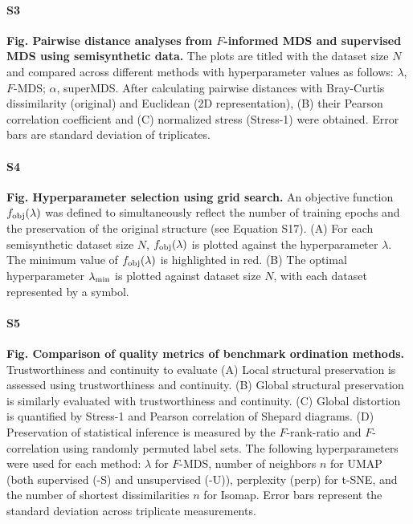 \documentclass[10pt,letterpaper]{article}
\newcommand{\1}{{\rm 1}\kern-0.24em{\rm I}}
\begin{document}
\paragraph*{S3}\hspace{-2ex}
\label{fig:sim_fmds_smds}
\textbf{Fig. Pairwise distance analyses from $F$-informed MDS and supervised MDS using semisynthetic data.} The plots are titled with the dataset size $N$ and compared across different methods with hyperparameter values as follows: $\lambda$, $F$-MDS; $\alpha$, superMDS. After calculating pairwise distances with Bray-Curtis dissimilarity (original) and Euclidean (2D representation), (B) their Pearson correlation coefficient and (C) normalized stress (Stress-1) were obtained. Error bars are standard deviation of triplicates.

\paragraph*{S4}\hspace{-2ex}
\label{fig:fmds_gridsearch}
\textbf{Fig. Hyperparameter selection using grid search.} An objective function $f_{\rm obj}(\lambda)$ was defined to simultaneously reflect the number of training epochs and the preservation of the original structure (see Equation S17). (A) For each semisynthetic dataset size $N$, $f_{\rm obj}(\lambda)$ is plotted against the hyperparameter $\lambda$. The minimum value of $f_{\rm obj}(\lambda)$ is highlighted in red. (B) The optimal hyperparameter $\lambda_{\rm min}$ is plotted against dataset size $N$, with each dataset represented by a symbol.

\paragraph*{S5}\hspace{-2ex}
\label{fig:sim_eval_all}
\textbf{Fig. Comparison of quality metrics of benchmark ordination methods.} Trustworthiness and continuity to evaluate (A) Local structural preservation is assessed using trustworthiness and continuity. (B) Global structural preservation is similarly evaluated with trustworthiness and continuity. (C) Global distortion is quantified by Stress-1 and Pearson correlation of Shepard diagrams. (D) Preservation of statistical inference is measured by the $F$-rank-ratio and $F$-correlation using randomly permuted label sets. The following hyperparameters were used for each method: $\lambda$ for $F$-MDS, number of neighbors $n$ for UMAP (both supervised (-S) and unsupervised (-U)), perplexity (perp) for t-SNE, and the number of shortest dissimilarities $n$ for Isomap. Error bars represent the standard deviation across triplicate measurements.
\end{document}
